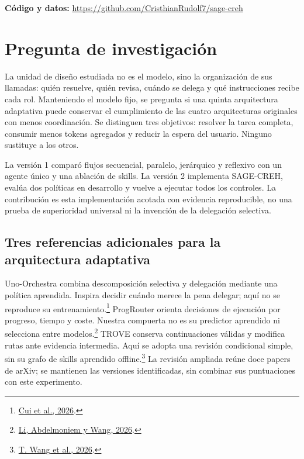 \documentclass[11pt,a4paper]{article}
\newcommand{\source}[2]{\footnote{\href{#1}{#2}.}}
\begin{document}


{\small\textbf{Código y datos:} \url{https://github.com/CristhianRudolf7/sage-creh}\par}

\section{Pregunta de investigación}
La unidad de diseño estudiada no es el modelo, sino la organización de sus llamadas:
quién resuelve, quién revisa, cuándo se delega y qué instrucciones recibe cada rol.
Manteniendo el modelo fijo, se pregunta si una quinta arquitectura adaptativa puede
conservar el cumplimiento de las cuatro arquitecturas originales con menos
coordinación. Se distinguen tres objetivos: resolver la tarea completa, consumir
menos tokens agregados y reducir la espera del usuario. Ninguno sustituye a los otros.

La versión 1 comparó flujos secuencial, paralelo, jerárquico y reflexivo con un
agente único y una ablación de skills. La versión 2 implementa SAGE-CREH, evalúa
dos políticas en desarrollo y vuelve a ejecutar todos los controles. La contribución
es esta implementación acotada con evidencia reproducible, no una prueba de
superioridad universal ni la invención de la delegación selectiva.


\subsection{Tres referencias adicionales para la arquitectura adaptativa}
Uno-Orchestra combina descomposición selectiva y delegación mediante una política
aprendida. Inspira decidir cuándo merece la pena delegar; aquí no se reproduce su
entrenamiento.\source{https://arxiv.org/html/2605.05007v1}{Cui et al., 2026}
ProgRouter orienta decisiones de ejecución por progreso, tiempo y coste. Nuestra
compuerta no es su predictor aprendido ni selecciona entre modelos.\source{https://arxiv.org/html/2608.25992v1}{Li, Abdelmoniem y Wang, 2026}
TROVE conserva continuaciones válidas y modifica rutas ante evidencia intermedia.
Aquí se adopta una revisión condicional simple, sin su grafo de skills aprendido
offline.\source{https://arxiv.org/html/2609.05019v1}{T. Wang et al., 2026}
La revisión ampliada reúne doce papers de arXiv; se mantienen las versiones
identificadas, sin combinar sus puntuaciones con este experimento.
\end{document}
